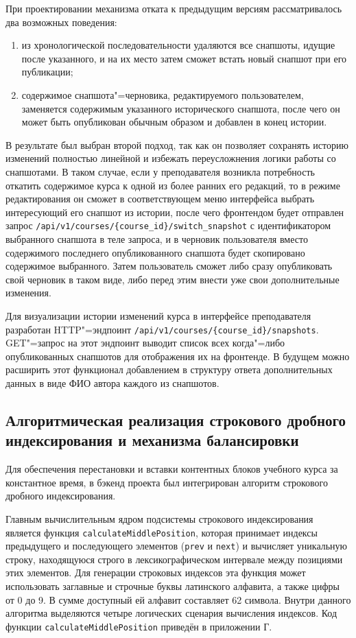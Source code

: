 \documentclass[coursework]{SCWorks}
\begin{document}
При проектировании механизма отката к предыдущим версиям рассматривалось два возможных поведения:

\begin{enumerate}
  \item из хронологической последовательности удаляются все снапшоты, идущие после указанного, и на их место затем сможет встать новый снапшот при его публикации;
  \item содержимое снапшота"=черновика, редактируемого пользователем, заменяется содержимым указанного исторического снапшота, после чего он может быть опубликован обычным образом и добавлен в конец истории.
\end{enumerate}

В результате был выбран второй подход, так как он позволяет сохранять историю изменений полностью линейной и избежать переусложнения логики работы со снапшотами. В таком случае, если у преподавателя возникла потребность откатить содержимое курса к одной из более ранних его редакций, то в режиме редактирования он сможет в соответствующем меню интерфейса выбрать интересующий его снапшот из истории, после чего фронтендом будет отправлен запрос \texttt{/api/v1/courses/\{course\_id\}/switch\_snapshot} с идентификатором выбранного снапшота в теле запроса, и в черновик пользователя вместо содержимого последнего опубликованного снапшота будет скопировано содержимое выбранного. Затем пользователь сможет либо сразу опубликовать свой черновик в таком виде, либо перед этим внести уже свои дополнительные изменения.

Для визуализации истории изменений курса в интерфейсе преподавателя разработан HTTP"=эндпоинт \texttt{/api/v1/courses/\{course\_id\}/snapshots}. GET"=запрос на этот эндпоинт выводит список всех когда"=либо опубликованных снапшотов для отображения их на фронтенде. В будущем можно расширить этот функционал добавлением в структуру ответа дополнительных данных в виде ФИО автора каждого из снапшотов.

\subsection{Алгоритмическая реализация строкового дробного индексирования и механизма балансировки}

Для обеспечения перестановки и вставки контентных блоков учебного курса за константное время, в бэкенд проекта был интегрирован алгоритм строкового дробного индексирования.

Главным вычислительным ядром подсистемы строкового индексирования является функция \texttt{calculateMiddlePosition}, которая принимает индексы предыдущего и последующего элементов (\texttt{prev} и \texttt{next}) и вычисляет уникальную строку, находящуюся строго в лексикографическом интервале между позициями этих элементов. Для генерации строковых индексов эта функция может использовать заглавные и строчные буквы латинского алфавита, а также цифры от 0 до 9. В сумме доступный ей алфавит составляет 62 символа. Внутри данного алгоритма выделяются четыре логических сценария вычисления индексов. Код функции \texttt{calculateMiddlePosition} приведён в приложении Г.
\end{document}
